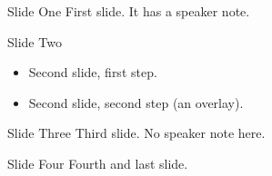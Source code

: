 \begin{frame}{Slide One}
  First slide.  It has a speaker note.
\end{frame}

\begin{frame}{Slide Two}
  \begin{itemize}
  \item<1-> Second slide, first step.
  \item<2-> Second slide, second step (an overlay).
  \end{itemize}
\end{frame}

\begin{frame}{Slide Three}
  Third slide.  No speaker note here.
\end{frame}

\begin{frame}{Slide Four}
  Fourth and last slide.
\end{frame}

